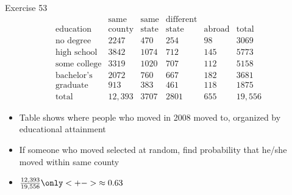 \documentclass[handout]{beamer}
\theoremstyle{definition}
\begin{document}
\begin{frame}{Exercise 53}
\[\begin{array}{r|llll|l}
&\text{same}&\text{same}&\text{different}&&\\
\text{education}&\text{county}
&\text{state}&\text{state}&\text{abroad}&\text{total}\\\hline
\text{no degree}&2247&470&254&98&3069\\
\text{high school}&3842&1074&712&145&5773\\
\text{some college}&3319&1020&707&112&5158\\
\text{bachelor's}&2072&760&667&182&3681\\
\text{graduate}&913&383&461&118&1875\\\hline
\text{total}&12,393&3707&2801&655&19,556
\end{array}\]
\begin{itemize}
\item Table shows where people who moved in 2008
moved to, organized by educational attainment
\item If someone who moved selected at random, find probability
that he/she moved within same county
\item $\frac{12,393}{19,556}\only<+->{\approx 0.63}$
\end{itemize}
\end{frame}
\end{document}
